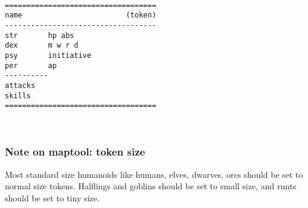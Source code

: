 \

\goodbreak \begin{samepage} \small \begin{verbatim}
===================================
name                        (token)
-----------------------------------
str       hp abs
dex       m w r d
psy       initiative
per       ap
----------
attacks
skills
===================================
\end{verbatim} \normalsize \end{samepage}

\

\flushbottom




\subsubsection*{Note on maptool: token size}
Most standard size humanoids like humans, elves, dwarves, orcs should be set to  normal size tokens. Halflings and goblins should be set to small size, and runts should be set to tiny size.

\






\goodbreak
\raggedbottom
{}

